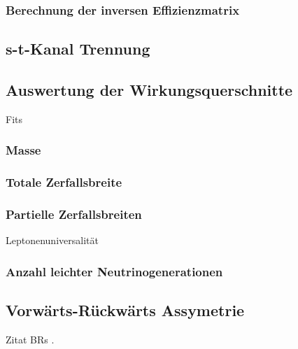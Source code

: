 \subsubsection{Berechnung der inversen Effizienzmatrix}

\subsection{s-t-Kanal Trennung}
\subsection{Auswertung der Wirkungsquerschnitte}
Fits
\subsubsection{Masse}
\subsubsection{Totale Zerfallsbreite}
\subsubsection{Partielle Zerfallsbreiten}
Leptonenuniversalität
\subsubsection{Anzahl leichter Neutrinogenerationen}
\subsection{Vorwärts-Rückwärts Assymetrie}

Zitat BRs \cite{pdg}.